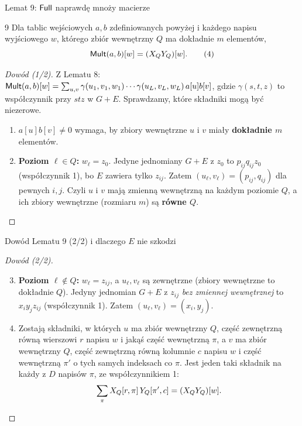 \begin{frame}{Lemat 9: $\mathsf{Full}$ naprawdę mnoży macierze}
  \begin{lemat}{9}
    Dla tablic wejściowych $a,b$ zdefiniowanych powyżej i każdego napisu wyjściowego $w$, którego zbiór wewnętrzny $Q$
    ma dokładnie $m$ elementów,
    \[
      \mathsf{Mult}(a,b)[w]=(X_QY_Q)[w].\tag{4}
    \]
  \end{lemat}
  \pause
  \begin{proof}[Dowód (1/2)]
    Z Lematu 8: $\mathsf{Mult}(a,b)[w]=\sum_{u,v}\gamma(u_1,v_1,w_1)\cdots\gamma(u_L,v_L,w_L)\,a[u]b[v]$, gdzie
    $\gamma(s,t,z)$ to współczynnik przy $stz$ w $G+E$. Sprawdzamy, które składniki mogą być niezerowe.
    \begin{enumerate}
      \item<3-> $a[u]b[v]\ne0$ wymaga, by zbiory wewnętrzne $u$ i $v$ miały \textbf{dokładnie $m$} elementów.
      \item<4-> \textbf{Poziom $\ell\in Q$:} $w_\ell=z_0$. Jedyne jednomiany $G+E$ z $z_0$ to $p_{ij}q_{ij}z_0$ (współczynnik 1),
        bo $E$ zawiera tylko $z_{ij}$. Zatem $(u_\ell,v_\ell)=(p_{ij},q_{ij})$ dla pewnych $i,j$.
        Czyli $u$ i $v$ mają zmienną wewnętrzną na każdym poziomie $Q$, a ich zbiory wewnętrzne
        (rozmiaru $m$) są \textbf{równe $Q$}.
    \end{enumerate}
  \end{proof}
\end{frame}

\begin{frame}{Dowód Lematu 9 (2/2) i dlaczego $E$ nie szkodzi}
  \begin{proof}[Dowód (2/2)]
    \begin{enumerate}\setcounter{enumi}{2}
      \item \textbf{Poziom $\ell\notin Q$:} $w_\ell=z_{ij}$, a $u_\ell,v_\ell$ są zewnętrzne (zbiory wewnętrzne to dokładnie $Q$).
        Jedyny jednomian $G+E$ z $z_{ij}$ \emph{bez zmiennej wewnętrznej} to $x_iy_jz_{ij}$ (współczynnik 1).
        Zatem $(u_\ell,v_\ell)=(x_i,y_j)$.
      \item<2-> Zostają składniki, w których $u$ ma zbiór wewnętrzny $Q$, część zewnętrzną równą wierszowi $r$ napisu $w$
        i jakąś część wewnętrzną $\pi$, a $v$ ma zbiór wewnętrzny $Q$, część zewnętrzną równą kolumnie $c$ napisu $w$
        i część wewnętrzną $\pi'$ o tych samych indeksach co $\pi$. Jest jeden taki składnik na każdy z $D$ napisów $\pi$,
        ze współczynnikiem 1:
        \[
          \sum_\pi X_Q[r,\pi]\,Y_Q[\pi',c]=(X_QY_Q)[w].\qedhere
        \]
    \end{enumerate}
  \end{proof}
\end{frame}

